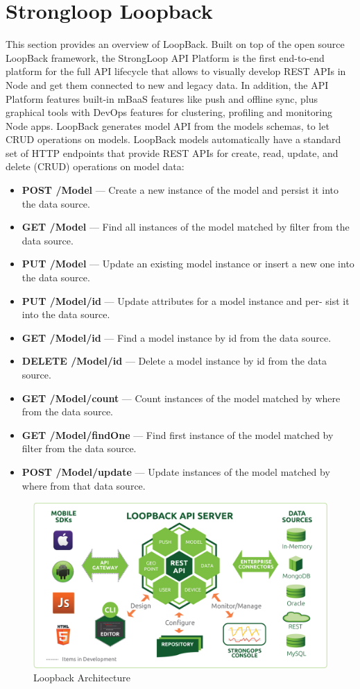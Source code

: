 \section{Strongloop Loopback}
\label{sec:strongloop_loopback}
This section provides an overview of LoopBack.
\newline
Built on top of the open source LoopBack framework, the StrongLoop API Platform is the first end-to-end platform for the full API lifecycle that allows to visually develop REST APIs in Node and get them connected to new and legacy data. In addition, the API Platform features built-in mBaaS features like push and offline sync, plus graphical tools with DevOps features for clustering, profiling and monitoring Node apps.
\newline
LoopBack generates model API from the models schemas, to let CRUD operations on models.
LoopBack models automatically have a standard set of HTTP endpoints that provide REST APIs for create, read, update, and delete (CRUD) operations on model data:
\begin{itemize}
\item \textbf{POST /Model} — Create a new instance of the model and persist it into the data source.
\item \textbf{GET /Model} — Find all instances of the model matched by filter from the data source.
\item \textbf{PUT /Model} — Update an existing model instance or insert a new one into the data source.
\item \textbf{PUT /Model/id} — Update attributes for a model instance and per- sist it into the data source.
\item \textbf{GET /Model/id} — Find a model instance by id from the data source.
\item \textbf{DELETE /Model/id } — Delete a model instance by id from the data source.
\item \textbf{GET /Model/count} — Count instances of the model matched by where from the data source.
\item \textbf{GET /Model/findOne} — Find first instance of the model matched by filter from the data source.
\item \textbf{POST /Model/update} — Update instances of the model matched by where from that data source.
\end{itemize}
\begin{figure}[htb]
 \centering
 \includegraphics[width=0.9\linewidth]{images/chapter2/loopback_architecture.jpg}\hfill
 \caption[Loopback Architecture]{Loopback Architecture}
 \label{fig:loopback_architecture}
\end{figure}
